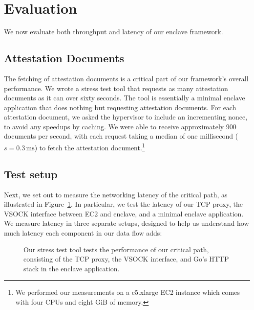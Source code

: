 \section{Evaluation}
\label{sec:evaluation}

We now evaluate both throughput and latency of our enclave framework.

\subsection{Attestation Documents}
\label{sec:attestation-performance}

The fetching of attestation documents is a critical part of our framework's
overall performance.  We wrote a stress test tool that requests as many
attestation documents as it can over sixty seconds.  The tool is essentially a
minimal enclave application that does nothing but requesting attestation
documents.  For each attestation document, we asked the hypervisor to include
an incrementing nonce, to avoid any speedups by caching.  We were able to
receive approximately 900 documents per second, with each request taking a
median of one millisecond ($s = 0.3\,\text{ms}$) to fetch the attestation
document.\footnote{We performed our measurements on a c5.xlarge EC2 instance
which comes with four CPUs and eight GiB of memory.}

\subsection{Test setup}
\label{sec:test-setup}

Next, we set out to measure the networking latency of the critical path, as
illustrated in Figure~\ref{fig:stress-test}.  In particular, we test the
latency of our TCP proxy, the VSOCK interface between EC2 and enclave, and a
minimal enclave application.
%
We measure latency in three separate setups, designed to help us understand how
much latency each component in our data flow adds:

\begin{figure}[t]
    \centering
    
    \caption{Our stress test tool tests the performance of our critical path,
    consisting of the TCP proxy, the VSOCK interface, and Go's HTTP stack in
    the enclave application.}
    \label{fig:stress-test}
\end{figure}

